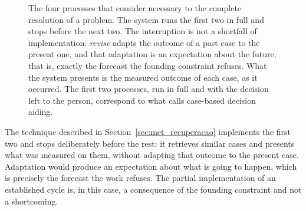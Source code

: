 \begin{figure}[htbp]
\centering
{}
\caption[The case-based reasoning cycle, and where the system stops]{The four processes that \textcite{aamodt1994cbr} consider necessary to the complete resolution of a problem. The system runs the first two in full and stops before the next two. The interruption is not a shortfall of implementation: \emph{revise} adapts the outcome of a past case to the present one, and that adaptation is an expectation about the future, that is, exactly the forecast the founding constraint refuses. What the system presents is the measured outcome of each case, as it occurred. The first two processes, run in full and with the decision left to the person, correspond to what \textcite{kolodner1991aiding} calls case-based decision aiding.}
\label{fig:ctx_cbr}
\end{figure}
The technique described in Section~\ref{sec:met_recuperacao} implements the first two and stops
deliberately before the rest: it retrieves similar cases and presents what was measured on them,
without adapting that outcome to the present case. Adaptation would produce an expectation about
what is going to happen, which is precisely the forecast the work refuses. The partial
implementation of an established cycle is, in this case, a consequence of the founding constraint
and not a shortcoming.

